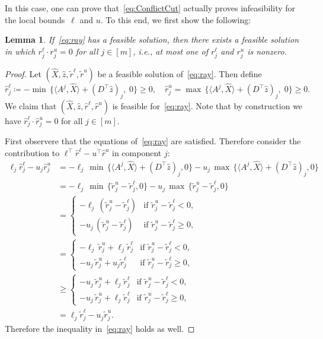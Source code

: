 \documentclass[10pt, a4paper]{article}
\newcommand{\define}{\coloneqq}
\newcommand{\skal}[2]{\langle{#1},{#2}\rangle}
\newcommand{\T}{^{\top}}
\newtheorem{lemma}[theorem]{Lemma}
\begin{document}
In this case, one can prove that~\eqref{eq:ConflictCut} actually proves
infeasibility for the local bounds~$\ell$ and $u$. To this end, we first
show the following:

\begin{lemma}\label{lemma:ComplemenatrySolution}
  If~\eqref{eq:ray} has a feasible solution, then there exists a feasible
  solution in which $r_j^\ell \cdot r_j^u = 0$ for all $j \in [m]$, i.e.,
  at most one of $r_j^\ell$ and $r_j^u$ is nonzero.
\end{lemma}

\begin{proof}
  Let $(\hat{X}, \hat{z}, \tilde{r}^\ell, \tilde{r}^u)$ be a feasible
  solution of~\eqref{eq:ray}. Then define
  \[
    \hat{r}^\ell_j \define - \min\,\{\skal{A^j}{\hat{X}} + (D\T \hat{z})_j,\; 0\} \geq 0,
    \quad
    \hat{r}^u_j = \max\,\{\skal{A^j}{\hat{X}} + (D\T \hat{z})_j,\; 0\} \geq 0.
  \]
  We claim that $(\hat{X}, \hat{z}, \hat{r}^\ell, \hat{r}^u)$ is feasible
  for~\eqref{eq:ray}. Note that by construction we have
  $\hat{r}^\ell_j \cdot \hat{r}^u_j = 0$ for all $j \in [m]$.

  First observere that the equations of~\eqref{eq:ray} are
  satisfied. Therefore consider the contribution to
  $\ell\T \hat{r}^\ell - u\T \hat{r}^u$ in component $j$:
  \begin{align*}
    \ell_j \hat{r}^\ell_j - u_j \hat{r}^u_j & = - \ell_j\, \min\,\{\skal{A^j}{\hat{X}} + (D\T \hat{z})_j, 0\} - u_j\, \max\,\{\skal{A^j}{\hat{X}} + (D\T \hat{z})_j, 0\}\\
    & = - \ell_j\, \min\,\{\tilde{r}^u_j - \tilde{r}^\ell_j, 0\} - u_j\, \max\,\{\tilde{r}^u_j - \tilde{r}^\ell_j, 0\}\\
    & = \begin{cases}
      - \ell_j\, (\tilde{r}^u_j - \tilde{r}^\ell_j) & \text{if } \tilde{r}^u_j - \tilde{r}^\ell_j < 0,\\
      - u_j\, (\tilde{r}^u_j - \tilde{r}^\ell_j) & \text{if } \tilde{r}^u_j - \tilde{r}^\ell_j \geq 0,
    \end{cases}\\
    & = \begin{cases}
      - \ell_j\, \tilde{r}^u_j + \ell_j \tilde{r}^\ell_j & \text{if } \tilde{r}^u_j - \tilde{r}^\ell_j < 0,\\
      - u_j\, \tilde{r}^u_j + u_j \tilde{r}^\ell_j & \text{if } \tilde{r}^u_j - \tilde{r}^\ell_j \geq 0,
    \end{cases}\\
    & \geq \begin{cases}
      - u_j\, \tilde{r}^u_j + \ell_j \tilde{r}^\ell_j & \text{if }  \tilde{r}^u_j - \tilde{r}^\ell_j < 0,\\
      - u_j\, \tilde{r}^u_j + \ell_j \tilde{r}^\ell_j & \text{if } \tilde{r}^u_j - \tilde{r}^\ell_j \geq 0,
    \end{cases}\\
    & = \ell_j \tilde{r}^\ell_j - u_j \tilde{r}^u_j.
  \end{align*}
  Therefore the inequality in~\eqref{eq:ray} holds as well.
\end{proof}
\end{document}
